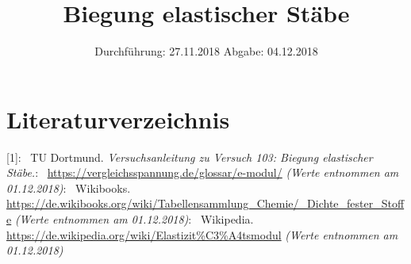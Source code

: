 

\subject{Nr. 103}
\title{Biegung elastischer Stäbe}
\date{%
  Durchführung: 27.11.2018
  \hspace{3em}
  Abgabe: 04.12.2018
}



\maketitle
\thispagestyle{empty}
\tableofcontents
\newpage






\printbibliography{}

\section{Literaturverzeichnis}

[1]: \ TU Dortmund. \textit{Versuchsanleitung zu Versuch 103: Biegung elastischer Stäbe.}\newline
[2]: \ \url{https://vergleichsspannung.de/glossar/e-modul/}
\textit{(Werte entnommen am 01.12.2018)}\newline
[3]: \ Wikibooks. \url{https://de.wikibooks.org/wiki/Tabellensammlung_Chemie/_Dichte_fester_Stoffe}
\textit{(Werte entnommen am 01.12.2018)}\newline
[4]: \ Wikipedia. \url{https://de.wikipedia.org/wiki/Elastizit%C3%A4tsmodul}
\textit{(Werte entnommen am 01.12.2018)}\newline


